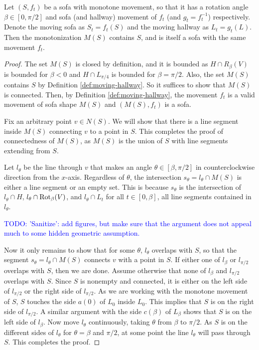 \begin{theorem}
\label{thm:monotonization-connected}
Let $(S, f_t)$ be a sofa with monotone movement, so that it has a rotation angle $\beta \in [0, \pi / 2]$ and sofa (and hallway) movement of $f_t$ (and $g_t = f_t^{-1}$) respectively.
Denote the moving sofa as $S_t = f_t(S)$ and the moving hallway as $L_t = g_t(L)$.
Then the monotonization $M(S)$ contains $S$, and is itself a sofa with the same movement $f_t$.
\end{theorem}
\begin{proof}
The set $M(S)$ is closed by definition, and it is bounded as $H \cap R_\beta(V)$ is bounded for $\beta < 0$ and $H \cap L_{\pi / 4}$ is bounded for $\beta = \pi / 2$.
Also, the set $M(S)$ contains $S$ by Definition \ref{def:moving-hallway}.
So it suffices to show that $M(S)$ is connected.
Then, by Definition \ref{def:moving-hallway}, the movement $f_t$ is a valid movement of sofa shape $M(S)$ and $(M(S), f_t)$ is a sofa.

Fix an arbitrary point $v \in N(S)$.
We will show that there is a line segment inside $M(S)$ connecting $v$ to a point in $S$. This completes the proof of connectedness of $M(S)$, as $M(S)$ is the union of $S$ with line segments extending from $S$.

Let $l_\theta$ be the line through $v$ that makes an angle $\theta \in [\beta, \pi / 2]$ in counterclockwise direction from the $x$-axis. 
Regardless of $\theta$, the intersection $s_\theta = l_\theta \cap M(S)$ is either a line segment or an empty set. This is because $s_\theta$ is the intersection of $l_\theta \cap H$, $l_\theta \cap \operatorname{Rot}_\beta(V)$, and $l_\theta \cap L_t$ for all $t \in [0, \beta]$, all line segments contained in $l_\theta$.

\textcolor{blue}{TODO: 'Sanitize': add figures, but make sure that the argument does not appeal much to some hidden geometric assumption.}

Now it only remains to show that for some $\theta$, $l_\theta$ overlaps with $S$, so that the segment $s_\theta = l_\theta \cap M(S)$ connects $v$ with a point in $S$. 
If either one of $l_\beta$ or $l_{\pi / 2}$ overlaps with $S$, then we are done. 
Assume otherwise that none of $l_\beta$ and $l_{\pi / 2}$ overlaps with $S$.
Since $S$ is nonempty and connected, it is either on the left side of $l_{\pi / 2}$ or the right side of $l_{\pi / 2}$.
As we are working with the monotone movement of $S$, $S$ touches the side $a(0)$ of $L_0$ inside $L_0$. This implies that $S$ is on the right side of $l_{\pi / 2}$.
A similar argument with the side $c(\beta)$ of $L_\beta$ shows that $S$ is on the left side of $l_\beta$.
Now move $l_\theta$ continuously, taking $\theta$ from $\beta$ to $\pi / 2$. As $S$ is on the different sides of $l_\theta$ for $\theta = \beta$ and $\pi / 2$, at some point the line $l_\theta$ will pass through $S$. This completes the proof.
\end{proof}

